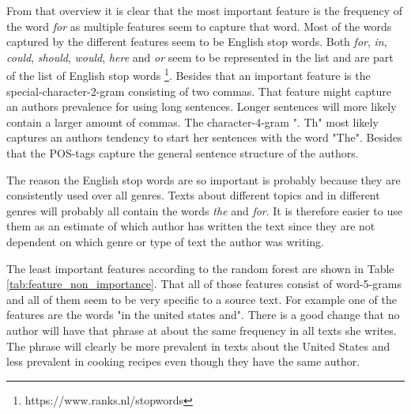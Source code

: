 From that overview it is clear that the most important feature is the frequency
of the word \textit{for} as multiple features seem to capture that word. Most
of the words captured by the different features seem to be English stop words.
Both \textit{for}, \textit{in}, \textit{could}, \textit{should}, \textit{would},
\textit{here} and \textit{or} seem to be represented in the list and are part
of the list of English stop words \footnote{https://www.ranks.nl/stopwords}.
Besides that an important feature is the special-character-2-gram consisting
of two commas. That feature might capture an authors prevalence for using long
sentences. Longer sentences will more likely contain a larger amount of commas.
The character-4-gram ". Th" most likely captures an authors tendency to start
her sentences with the word "The". Besides that the \gls{POS}-tags capture the
general sentence structure of the authors.

The reason the English stop words are so important is probably because they are
consistently used over all genres. Texts about different topics and in different
genres will probably all contain the words \textit{the} and \textit{for}. It
is therefore easier to use them as an estimate of which author has written the
text since they are not dependent on which genre or type of text the author was
writing.

The least important features according to the random forest are shown in Table
\ref{tab:feature_non_importance}. That all of those features
consist of word-5-grams and all of them seem to be very specific to a source
text. For example one of the features are the words "in the united states and".
There is a good change that no author will have that phrase at about the same
frequency in all texts she writes. The phrase will clearly be more prevalent in
texts about the United States and less prevalent in cooking recipes even though
they have the same author.


